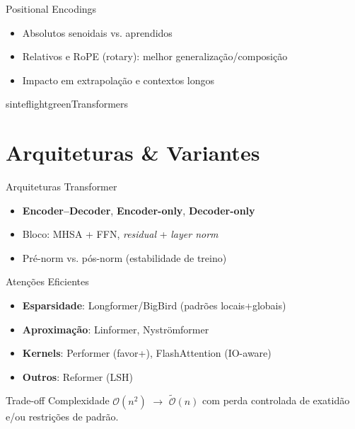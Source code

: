 \documentclass{beamer}
\begin{document}
\begin{frame}{Positional Encodings}
	\begin{itemize}[<+->]
		\item Absolutos senoidais vs. aprendidos
		\item Relativos e RoPE (rotary): melhor generalização/composição
		\item Impacto em extrapolação e contextos longos
	\end{itemize}
\end{frame}

\begin{chapter}{sinteflightgreen}{Transformers}\end{chapter}

\section{Arquiteturas \& Variantes}
\begin{frame}{Arquiteturas Transformer}
	\begin{itemize}[<+->]
		\item \textbf{Encoder--Decoder}, \textbf{Encoder-only}, \textbf{Decoder-only}
		\item Bloco: MHSA + FFN, \textit{residual} + \textit{layer norm}
		\item Pré-norm vs. pós-norm (estabilidade de treino)
	\end{itemize}
\end{frame}

\begin{frame}{Atenções Eficientes}
	\begin{itemize}[<+->]
		\item \textbf{Esparsidade}: Longformer/BigBird (padrões locais+globais)
		\item \textbf{Aproximação}: Linformer, Nyströmformer
		\item \textbf{Kernels}: Performer (favor+), FlashAttention (IO-aware)
		\item \textbf{Outros}: Reformer (LSH)
	\end{itemize}
	\begin{block}{Trade-off}
		Complexidade $\mathcal{O}(n^2)$ $\rightarrow$ $\tilde{\mathcal{O}}(n)$ com perda controlada de exatidão e/ou restrições de padrão.
	\end{block}
\end{frame}
\end{document}
